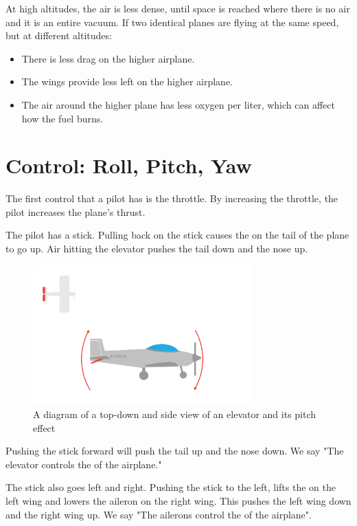 At high altitudes, the air is less dense, until space is reached where there is no air and it is an entire vacuum. If two identical planes are flying  at the same speed,  but at different altitudes: 
\begin{itemize}
\item There is less drag on the higher airplane.
\item The wings provide less left on the higher airplane.
\item The air around the higher plane has less oxygen per liter, which can affect how the fuel burns.
\end{itemize}

\section{Control: Roll, Pitch, Yaw}
The first control that a pilot has is the throttle. By increasing the throttle, the pilot increases the plane's thrust.

The pilot has a stick.  Pulling back on the stick causes the  on the tail of the plane to go up.  Air hitting the elevator pushes the tail down and the nose up. 

\begin{figure}[htbp]
    \centering
    \includegraphics[width=0.75\textwidth]{elevator.png}
    \caption{A diagram of a top-down and side view of an elevator and its pitch effect}
    \label{fig:elevator}
\end{figure}
    
Pushing the stick forward will push the tail up and the nose down.  We say "The elevator controls the  of the airplane."

The stick also goes left and right. Pushing the stick to the left,  lifts the  on the left wing and lowers the aileron on the right wing.  This pushes the left wing down and 
the right wing up.  We say "The ailerons control the   of the airplane". 

